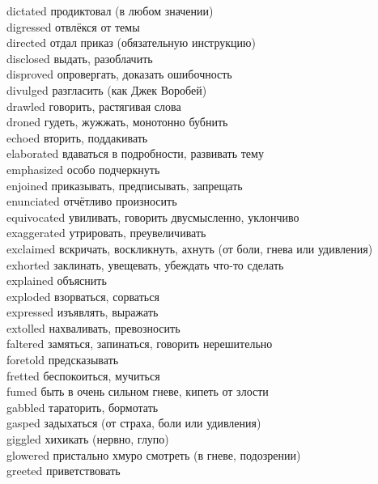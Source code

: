 dictated \hfill продиктовал (в любом значении)\\
digressed \hfill отвлёкся от темы\\
directed \hfill отдал приказ (обязательную инструкцию)\\
disclosed \hfill выдать, разоблачить\\
disproved \hfill опровергать, доказать ошибочность\\
divulged \hfill разгласить (как Джек Воробей)\\
drawled \hfill говорить, растягивая слова\\
droned \hfill гудеть, жужжать, монотонно бубнить\\
echoed \hfill вторить, поддакивать\\
elaborated \hfill вдаваться в подробности, развивать тему\\
emphasized \hfill особо подчеркнуть\\
enjoined \hfill приказывать, предписывать, запрещать\\
enunciated \hfill отчётливо произносить\\
equivocated \hfill увиливать, говорить двусмысленно, уклончиво\\
exaggerated \hfill утрировать, преувеличивать\\
exclaimed \hfill вскричать, воскликнуть, ахнуть (от боли, гнева или удивления)\\
exhorted \hfill заклинать, увещевать, убеждать что-то сделать\\
explained \hfill объяснить\\
exploded \hfill взорваться, сорваться\\
expressed \hfill изъявлять, выражать\\
extolled \hfill нахваливать, превозносить\\
faltered \hfill замяться, запинаться, говорить нерешительно\\
foretold \hfill предсказывать\\
fretted \hfill беспокоиться, мучиться\\
fumed \hfill быть в очень сильном гневе, кипеть от злости\\
gabbled \hfill тараторить, бормотать\\
gasped \hfill задыхаться (от страха, боли или удивления)\\
giggled \hfill хихикать (нервно, глупо)\\
glowered \hfill пристально хмуро смотреть (в гневе, подозрении)\\
greeted \hfill приветствовать\\
